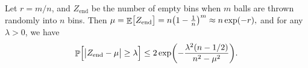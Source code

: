 
\begin{theorem}
    Let $r= m/n$, and $Z_{\textrm{end}}$ be the number of empty bins when
    $m$ balls are thrown randomly into $n$ bins. Then
    \begin{math}
        \mu = \Ex{\bigl. Z_{\textrm{end}}} = n \pth[]{1-\frac{1}{n}}^m
        \approx n \exp(-r),
    \end{math}
    and for any $\lambda > 0$, we have
    \begin{equation*}
        \Prob{ \Bigl. \cardin{\bigl. Z_{\textrm{end}} -
              \mu} \geq \lambda } \leq 2 \exp \pth{ -
           \frac{\lambda^2(n-1/2)}{n^2 - \mu^2}}.        
    \end{equation*}
\end{theorem}


